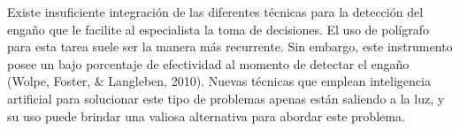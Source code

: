 Existe insuficiente integración de las diferentes técnicas para la detección del engaño que le facilite al especialista la toma de decisiones. El uso de polígrafo para esta tarea suele ser la manera más recurrente. Sin embargo, este instrumento posee un bajo porcentaje de efectividad al momento de detectar el engaño (Wolpe, Foster, & Langleben, 2010). Nuevas técnicas que emplean inteligencia artificial para solucionar este tipo de problemas apenas están saliendo a la luz, y su uso puede brindar una valiosa alternativa para abordar este problema.  
